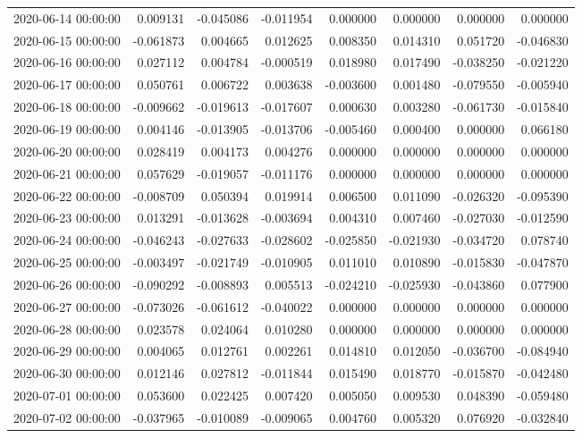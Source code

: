 \begin{tabular}{lrrrrrrr}
2020-06-14 00:00:00 & 0.009131 & -0.045086 & -0.011954 & 0.000000 & 0.000000 & 0.000000 & 0.000000 \\
2020-06-15 00:00:00 & -0.061873 & 0.004665 & 0.012625 & 0.008350 & 0.014310 & 0.051720 & -0.046830 \\
2020-06-16 00:00:00 & 0.027112 & 0.004784 & -0.000519 & 0.018980 & 0.017490 & -0.038250 & -0.021220 \\
2020-06-17 00:00:00 & 0.050761 & 0.006722 & 0.003638 & -0.003600 & 0.001480 & -0.079550 & -0.005940 \\
2020-06-18 00:00:00 & -0.009662 & -0.019613 & -0.017607 & 0.000630 & 0.003280 & -0.061730 & -0.015840 \\
2020-06-19 00:00:00 & 0.004146 & -0.013905 & -0.013706 & -0.005460 & 0.000400 & 0.000000 & 0.066180 \\
2020-06-20 00:00:00 & 0.028419 & 0.004173 & 0.004276 & 0.000000 & 0.000000 & 0.000000 & 0.000000 \\
2020-06-21 00:00:00 & 0.057629 & -0.019057 & -0.011176 & 0.000000 & 0.000000 & 0.000000 & 0.000000 \\
2020-06-22 00:00:00 & -0.008709 & 0.050394 & 0.019914 & 0.006500 & 0.011090 & -0.026320 & -0.095390 \\
2020-06-23 00:00:00 & 0.013291 & -0.013628 & -0.003694 & 0.004310 & 0.007460 & -0.027030 & -0.012590 \\
2020-06-24 00:00:00 & -0.046243 & -0.027633 & -0.028602 & -0.025850 & -0.021930 & -0.034720 & 0.078740 \\
2020-06-25 00:00:00 & -0.003497 & -0.021749 & -0.010905 & 0.011010 & 0.010890 & -0.015830 & -0.047870 \\
2020-06-26 00:00:00 & -0.090292 & -0.008893 & 0.005513 & -0.024210 & -0.025930 & -0.043860 & 0.077900 \\
2020-06-27 00:00:00 & -0.073026 & -0.061612 & -0.040022 & 0.000000 & 0.000000 & 0.000000 & 0.000000 \\
2020-06-28 00:00:00 & 0.023578 & 0.024064 & 0.010280 & 0.000000 & 0.000000 & 0.000000 & 0.000000 \\
2020-06-29 00:00:00 & 0.004065 & 0.012761 & 0.002261 & 0.014810 & 0.012050 & -0.036700 & -0.084940 \\
2020-06-30 00:00:00 & 0.012146 & 0.027812 & -0.011844 & 0.015490 & 0.018770 & -0.015870 & -0.042480 \\
2020-07-01 00:00:00 & 0.053600 & 0.022425 & 0.007420 & 0.005050 & 0.009530 & 0.048390 & -0.059480 \\
2020-07-02 00:00:00 & -0.037965 & -0.010089 & -0.009065 & 0.004760 & 0.005320 & 0.076920 & -0.032840 \\

\end{tabular}
